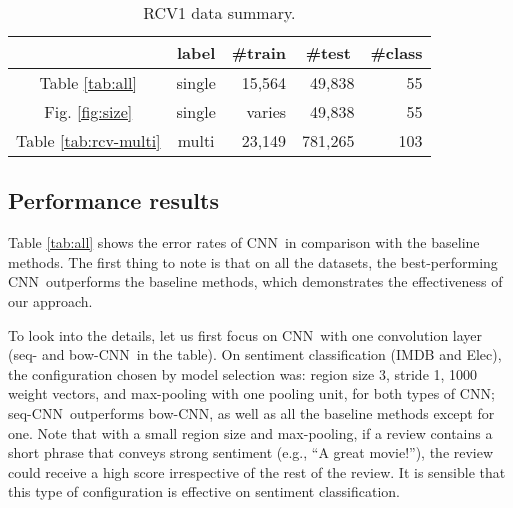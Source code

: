 \documentclass[11pt,letterpaper]{article}
\newcommand{\cnn}{CNN}
\newcommand{\scnnpfx}{seq}
\newcommand{\scnn}{seq-CNN}
\newcommand{\bcnn}{bow-CNN}
\newcommand{\Elec}{Elec}
\begin{document}
\begin{table}
\begin{center}
\begin{footnotesize}
\begin{tabular}{|c|c|r|r|r|} 
\hline
   & label          &\multicolumn{1}{|c|}{\#train}&\multicolumn{1}{|c|}{\#test}& \#class \\
\hline
Table \ref{tab:all}  & single  & 15,564 & 49,838 & 55 \\\hline
Fig. \ref{fig:size}  & single  & varies &  49,838 & 55 \\\hline                                                                
Table \ref{tab:rcv-multi}   & multi   & 23,149 & 781,265 & 103 \\
\hline
\end{tabular}
\end{footnotesize}
\vspace{-0.1in}
\caption{ \label{tab:rcv-data} \small 
RCV1 data summary.  
}
\end{center}
\end{table}


\subsection{Performance results}
Table \ref{tab:all} shows the error rates of \cnn\ in comparison with 
the baseline methods. The first thing to note is that on all the datasets, 
the best-performing \cnn\ outperforms the baseline methods, 
which demonstrates the effectiveness of our approach.  
  
To look into the details, 
let us first focus on \cnn\ with one convolution layer 
(\scnnpfx- and \bcnn\ in the table).  
On sentiment classification (IMDB and \Elec), 
the configuration chosen by model selection was: region size 3, stride 1, 1000 weight vectors, and max-pooling 
with one pooling unit, for both types of \cnn; 
\scnn\ outperforms \bcnn, as well as all the baseline methods except for one.  
Note that with a small region size and max-pooling, 
if a review contains a short phrase that conveys strong sentiment 
(e.g., ``A great movie!''), the review could receive a high score irrespective of the rest of the review. 
It is sensible that this type of configuration is effective on sentiment classification.  
\end{document}

